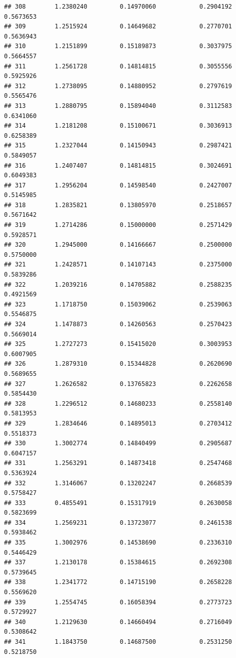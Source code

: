 \documentclass[]{article}
\begin{document}
\begin{verbatim}
## 308        1.2380240         0.14970060            0.2904192        0.5673653
## 309        1.2515924         0.14649682            0.2770701        0.5636943
## 310        1.2151899         0.15189873            0.3037975        0.5664557
## 311        1.2561728         0.14814815            0.3055556        0.5925926
## 312        1.2738095         0.14880952            0.2797619        0.5565476
## 313        1.2880795         0.15894040            0.3112583        0.6341060
## 314        1.2181208         0.15100671            0.3036913        0.6258389
## 315        1.2327044         0.14150943            0.2987421        0.5849057
## 316        1.2407407         0.14814815            0.3024691        0.6049383
## 317        1.2956204         0.14598540            0.2427007        0.5145985
## 318        1.2835821         0.13805970            0.2518657        0.5671642
## 319        1.2714286         0.15000000            0.2571429        0.5928571
## 320        1.2945000         0.14166667            0.2500000        0.5750000
## 321        1.2428571         0.14107143            0.2375000        0.5839286
## 322        1.2039216         0.14705882            0.2588235        0.4921569
## 323        1.1718750         0.15039062            0.2539063        0.5546875
## 324        1.1478873         0.14260563            0.2570423        0.5669014
## 325        1.2727273         0.15415020            0.3003953        0.6007905
## 326        1.2879310         0.15344828            0.2620690        0.5689655
## 327        1.2626582         0.13765823            0.2262658        0.5854430
## 328        1.2296512         0.14680233            0.2558140        0.5813953
## 329        1.2834646         0.14895013            0.2703412        0.5518373
## 330        1.3002774         0.14840499            0.2905687        0.6047157
## 331        1.2563291         0.14873418            0.2547468        0.5363924
## 332        1.3146067         0.13202247            0.2668539        0.5758427
## 333        0.4855491         0.15317919            0.2630058        0.5823699
## 334        1.2569231         0.13723077            0.2461538        0.5938462
## 335        1.3002976         0.14538690            0.2336310        0.5446429
## 337        1.2130178         0.15384615            0.2692308        0.5739645
## 338        1.2341772         0.14715190            0.2658228        0.5569620
## 339        1.2554745         0.16058394            0.2773723        0.5729927
## 340        1.2129630         0.14660494            0.2716049        0.5308642
## 341        1.1843750         0.14687500            0.2531250        0.5218750

\end{verbatim}
\end{document}
